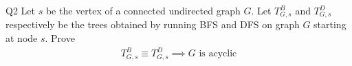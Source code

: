 \begin{problem}
  {Q2}
  Let $s$ be the vertex of a connected undirected graph $G$. Let $T_{G,s}^{B}$ and $T_{G,s}^{D}$ respectively
  be the trees obtained by running BFS and DFS on graph $G$ starting at node $s$. Prove
  \begin{align*}
    T_{G,s}^{B} \equiv T_{G,s}^{D} \implies G \text{ is acyclic}
  \end{align*}
\end{problem}
